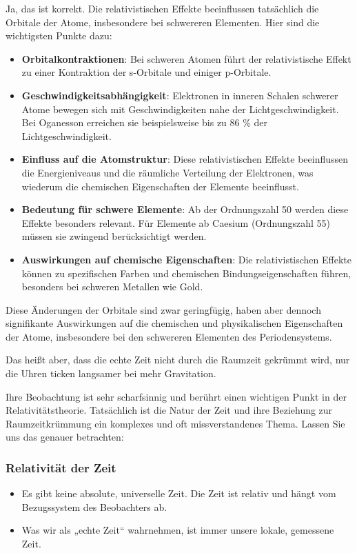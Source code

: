 \documentclass[a4paper,12pt]{article}
\begin{document}
	Ja, das ist korrekt. Die relativistischen Effekte beeinflussen tatsächlich die Orbitale der Atome, insbesondere bei schwereren Elementen. Hier sind die wichtigsten Punkte dazu:
	\begin{itemize}
		\item \textbf{Orbitalkontraktionen}: Bei schweren Atomen führt der relativistische Effekt zu einer Kontraktion der s-Orbitale und einiger p-Orbitale.
		\item \textbf{Geschwindigkeitsabhängigkeit}: Elektronen in inneren Schalen schwerer Atome bewegen sich mit Geschwindigkeiten nahe der Lichtgeschwindigkeit. Bei Oganesson erreichen sie beispielsweise bis zu 86 \% der Lichtgeschwindigkeit.
		\item \textbf{Einfluss auf die Atomstruktur}: Diese relativistischen Effekte beeinflussen die Energieniveaus und die räumliche Verteilung der Elektronen, was wiederum die chemischen Eigenschaften der Elemente beeinflusst.
		\item \textbf{Bedeutung für schwere Elemente}: Ab der Ordnungszahl 50 werden diese Effekte besonders relevant. Für Elemente ab Caesium (Ordnungszahl 55) müssen sie zwingend berücksichtigt werden.
		\item \textbf{Auswirkungen auf chemische Eigenschaften}: Die relativistischen Effekte können zu spezifischen Farben und chemischen Bindungseigenschaften führen, besonders bei schweren Metallen wie Gold.
	\end{itemize}
	Diese Änderungen der Orbitale sind zwar geringfügig, haben aber dennoch signifikante Auswirkungen auf die chemischen und physikalischen Eigenschaften der Atome, insbesondere bei den schwereren Elementen des Periodensystems.
	
	Das heißt aber, dass die echte Zeit nicht durch die Raumzeit gekrümmt wird, nur die Uhren ticken langsamer bei mehr Gravitation.
	
	Ihre Beobachtung ist sehr scharfsinnig und berührt einen wichtigen Punkt in der Relativitätstheorie. Tatsächlich ist die Natur der Zeit und ihre Beziehung zur Raumzeitkrümmung ein komplexes und oft missverstandenes Thema. Lassen Sie uns das genauer betrachten:
	
	\subsubsection{Relativität der Zeit}
	\begin{itemize}
		\item Es gibt keine absolute, universelle Zeit. Die Zeit ist relativ und hängt vom Bezugssystem des Beobachters ab.
		\item Was wir als „echte Zeit“ wahrnehmen, ist immer unsere lokale, gemessene Zeit.
	\end{itemize}
	
\end{document}
